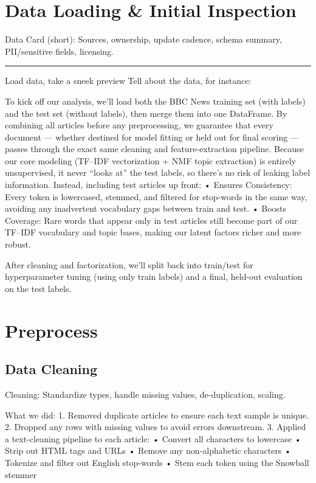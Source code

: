 \documentclass[
  letterpaper,
  DIV=11,
  numbers=noendperiod]{scrartcl}
\begin{document}
\section{Data Loading \& Initial
Inspection}\label{data-loading-initial-inspection}

Data Card (short): Sources, ownership, update cadence, schema summary,
PII/sensitive fields, licensing.

\begin{center}\rule{0.5\linewidth}{0.5pt}\end{center}

Load data, take a sneek preview Tell about the data, for instance:

To kick off our analysis, we'll load both the BBC News training set
(with labels) and the test set (without labels), then merge them into
one DataFrame. By combining all articles before any preprocessing, we
guarantee that every document --- whether destined for model fitting or
held out for final scoring --- passes through the exact same cleaning
and feature-extraction pipeline. Because our core modeling (TF--IDF
vectorization + NMF topic extraction) is entirely unsupervised, it never
``looks at'' the test labels, so there's no risk of leaking label
information. Instead, including test articles up front: • Ensures
Consistency: Every token is lowercased, stemmed, and filtered for
stop-words in the same way, avoiding any inadvertent vocabulary gaps
between train and test. • Boosts Coverage: Rare words that appear only
in test articles still become part of our TF--IDF vocabulary and topic
bases, making our latent factors richer and more robust.

After cleaning and factorization, we'll split back into train/test for
hyperparameter tuning (using only train labels) and a final, held-out
evaluation on the test labels.

\section{Preprocess}\label{preprocess}

\subsection{Data Cleaning}\label{data-cleaning}

Cleaning: Standardize types, handle missing values, de-duplication,
scaling.

What we did: 1. Removed duplicate articles to ensure each text sample is
unique. 2. Dropped any rows with missing values to avoid errors
downstream. 3. Applied a text-cleaning pipeline to each article: •
Convert all characters to lowercase • Strip out HTML tags and URLs •
Remove any non-alphabetic characters • Tokenize and filter out English
stop-words • Stem each token using the Snowball stemmer
\end{document}
